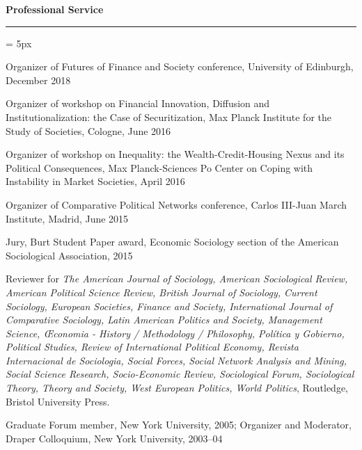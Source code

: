 \documentclass[12pt,letterpaper]{article}
\renewcommand{\labelitemi}{$$}
\newcommand{\sectionhead}[1]{\begin{flushleft}\large\bf{#1}\vspace{.1cm}\hrule\end{flushleft}}
\begin{document}

\sectionhead{Professional Service }
\begin{list}{\labelitemi}{\leftmargin = 5px}
\item Organizer of Futures of Finance and Society conference, University of Edinburgh, December 2018
\item Organizer of workshop on Financial Innovation, Diffusion and Institutionalization: the Case of Securitization, Max Planck Institute for the Study of Societies, Cologne, June 2016
\item Organizer of workshop on Inequality: the Wealth-Credit-Housing Nexus and its Political Consequences, Max Planck-Sciences Po Center on Coping with Instability in Market Societies, April 2016
\item Organizer of Comparative Political Networks conference, Carlos III-Juan March Institute, Madrid, June 2015
\item Jury, Burt Student Paper award, Economic Sociology section of the American Sociological Association, 2015
\item Reviewer for \emph{The American Journal of Sociology, American Sociological Review, American Political Science Review, British Journal of Sociology, Current Sociology,  European Societies, Finance and Society, International Journal of Comparative Sociology, Latin American Politics and Society, Management Science, \OE conomia - History / Methodology / Philosophy, Pol\'itica y Gobierno, Political Studies, Review of International Political Economy, Revista Internacional de Sociologia, Social Forces, Social Network Analysis and Mining, Social Science Research, Socio-Economic Review, Sociological Forum, Sociological Theory, Theory and Society, West European Politics, World Politics}, Routledge, Bristol University Press.
\item Graduate Forum member, New York University, 2005; Organizer and Moderator, Draper Colloquium, New York University, 2003--04 
\end{list}
\end{document}
